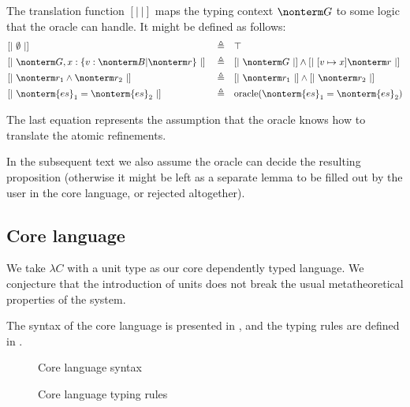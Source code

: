 \documentclass[a4paper]{article}
\begin{document}
The translation function $[|\ |]$ maps the typing context $\nonterm G$ to some logic
that the oracle can handle.
It might be defined as follows:
\begin{equation}
\begin{aligned}
  & [|\ \emptyset\ |]                                         && \triangleq && \top																						            \\
  & [|\ \nonterm G, x : \{ v : \nonterm B | \nonterm r \}\ |] && \triangleq && [|\ \nonterm G\ |] \land [|\ [ v \mapsto x ] \nonterm r\ |]  \\
  & [|\ \nonterm r_1 \land \nonterm r_2\ |]                   && \triangleq && [|\ \nonterm r_1\ |] \land [|\ \nonterm r_2\ |]              \\
  & [|\ \nonterm{es}_1 = \nonterm{es}_2\ |]                   && \triangleq && \text{oracle}(\nonterm{es}_1 = \nonterm{es}_2)             \\
\end{aligned}
\end{equation}

The last equation represents the assumption
that the oracle knows how to translate the atomic refinements.


In the subsequent text we also assume the oracle can decide the resulting proposition
(otherwise it might be left as a separate lemma to be filled out by the user in the core language, or rejected altogether).

\subsection{Core language}

We take $\lambda C$ \cite{TTFPLambdaC}
with a unit type as our core dependently typed language.
We conjecture that the introduction of units
does not break the usual metatheoretical properties of the system.

The syntax of the core language is presented in ,
and the typing rules are defined in .

\begin{figure}[ht]
  \footnotesize
  \caption{Core language syntax}
  \label{fig:core_syntax}
\end{figure}

\begin{figure}[ht]
  \footnotesize
  \caption{Core language typing rules}
  \label{fig:core_typing}
\end{figure}
\end{document}
